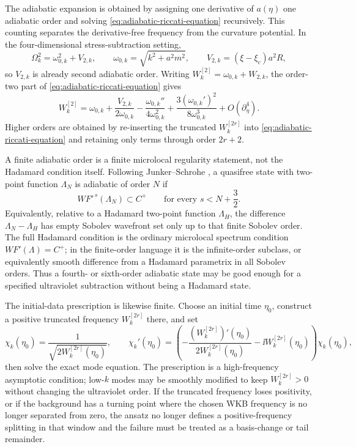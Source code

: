 The adiabatic expansion is obtained by assigning one derivative of
\(a(\eta)\) one adiabatic order and solving
\eqref{eq:adiabatic-riccati-equation} recursively.  This counting separates
the derivative-free frequency from the curvature potential.  In the
four-dimensional stress-subtraction setting,
\begin{equation}
  \Omega_k^2
  =
  \omega_{0,k}^2+V_{2,k},
  \qquad
  \omega_{0,k}=\sqrt{k^2+a^2m^2},
  \qquad
  V_{2,k}=(\xi-\xi_c)a^2R ,
  \label{eq:adiabatic-frequency-order-split}
\end{equation}
so \(V_{2,k}\) is already second adiabatic order.  Writing
\(W_k^{[2]}=\omega_{0,k}+W_{2,k}\), the order-two part of
\eqref{eq:adiabatic-riccati-equation} gives
\begin{equation}
  W_k^{[2]}
  =
  \omega_{0,k}
  +
  \frac{V_{2,k}}{2\omega_{0,k}}
  -
  \frac{\omega_{0,k}''}{4\omega_{0,k}^2}
  +
  \frac{3(\omega_{0,k}')^2}{8\omega_{0,k}^3}
  +O(\partial_\eta^4).
  \label{eq:adiabatic-second-order-frequency}
\end{equation}
Higher orders are obtained by re-inserting the truncated \(W_k^{[2r]}\) into
\eqref{eq:adiabatic-riccati-equation} and retaining only terms through order
\(2r+2\).

A finite adiabatic order is a finite microlocal regularity statement, not the
Hadamard condition itself.  Following Junker--Schrohe
\cite{JunkerSchrohe2002AdiabaticVacua}, a quasifree state with two-point
function \(\Lambda_N\) is adiabatic of order \(N\) if
\[
  WF'^{\,s}(\Lambda_N)\subset C^+
  \qquad\text{for every }s<N+\frac32 .
\]
Equivalently, relative to a Hadamard two-point function \(\Lambda_H\), the
difference \(\Lambda_N-\Lambda_H\) has empty Sobolev wavefront set only up to
that finite Sobolev order.  The full Hadamard condition is the ordinary
microlocal spectrum condition \(WF'(\Lambda)=C^+\); in the finite-order
language it is the infinite-order subclass, or equivalently smooth difference
from a Hadamard parametrix in all Sobolev orders.  Thus a fourth- or
sixth-order adiabatic state may be good enough for a specified ultraviolet
subtraction without being a Hadamard state.

The initial-data prescription is likewise finite.  Choose an initial time
\(\eta_0\), construct a positive truncated frequency \(W_k^{[2r]}\) there, and
set
\begin{equation}
  \chi_k(\eta_0)=\frac{1}{\sqrt{2W_k^{[2r]}(\eta_0)}},
  \qquad
  \chi_k'(\eta_0)
  =
  \left(
    -\frac{(W_k^{[2r]})'(\eta_0)}{2W_k^{[2r]}(\eta_0)}
    -\ii W_k^{[2r]}(\eta_0)
  \right)\chi_k(\eta_0),
  \label{eq:adiabatic-truncated-initial-data}
\end{equation}
then solve the exact mode equation.  The prescription is a high-frequency
asymptotic condition; low-\(k\) modes may be smoothly modified to keep
\(W_k^{[2r]}>0\) without changing the ultraviolet order.  If the truncated
frequency loses positivity, or if the background has a turning point where the
chosen WKB frequency is no longer separated from zero, the ansatz no longer
defines a positive-frequency splitting in that window and the failure must be
treated as a basis-change or tail remainder.

